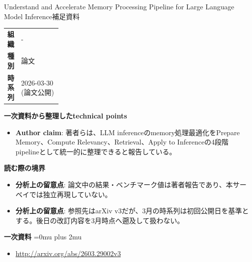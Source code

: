 \begin{technicalnote}{Understand and Accelerate Memory Processing Pipeline for Large Language Model Inference}{補足資料}
\begingroup
\begin{tabularx}{\linewidth}{@{}>{\bfseries}p{0.22\linewidth}X@{}}
組織 & - \\
種別 & 論文 \\
時系列 & 2026-03-30 (論文公開) \\
\end{tabularx}
\smallskip
{\bfseries 一次資料から整理したtechnical points}
\begin{itemize}[leftmargin=1.5em,itemsep=0.35em]
\item \textbf{Author claim}: 著者らは、LLM inferenceのmemory処理最適化をPrepare Memory、Compute Relevancy、Retrieval、Apply to Inferenceの4段階pipelineとして統一的に整理できると報告している。
\end{itemize}
\begin{minipage}{\linewidth}
{\bfseries 読む際の境界}
\begin{itemize}[leftmargin=1.5em,itemsep=0.35em]
\item \textbf{分析上の留意点}: 論文中の結果・ベンチマーク値は著者報告であり、本サーベイでは独立再現していない。
\item \textbf{分析上の留意点}: 参照先はarXiv v3だが、3月の時系列は初回公開日を基準とする。後日の改訂内容を3月時点へ遡及して扱わない。
\end{itemize}
\begin{samepage}
{\bfseries 一次資料}
\begingroup\sloppy
\Urlmuskip=0mu plus 2mu\relax
\begin{itemize}[leftmargin=1.5em,itemsep=0.25em]
\item {\scriptsize\url{http://arxiv.org/abs/2603.29002v3}}
\end{itemize}
\endgroup
\end{samepage}
\end{minipage}
\endgroup
\end{technicalnote}
\medskip
